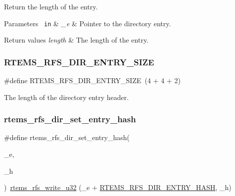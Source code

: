 Return the length of the entry.


\begin{DoxyParams}[1]{Parameters}
\mbox{\texttt{ in}}  & {\em \+\_\+e} & Pointer to the directory entry.\\
\hline
\end{DoxyParams}

\begin{DoxyRetVals}{Return values}
{\em length} & The length of the entry. \\
\hline
\end{DoxyRetVals}
\mbox{\label{rtems-rfs-dir_8h_a57764521961897da4d101db20a52b054}} 
\subsubsection{\texorpdfstring{RTEMS\_RFS\_DIR\_ENTRY\_SIZE}{RTEMS\_RFS\_DIR\_ENTRY\_SIZE}}
{\footnotesize\ttfamily \#define R\+T\+E\+M\+S\+\_\+\+R\+F\+S\+\_\+\+D\+I\+R\+\_\+\+E\+N\+T\+R\+Y\+\_\+\+S\+I\+ZE~(4 + 4 + 2)}

The length of the directory entry header. \mbox{\label{rtems-rfs-dir_8h_a654eb125381a6880f1f2c681c762888c}} 
\subsubsection{\texorpdfstring{rtems\_rfs\_dir\_set\_entry\_hash}{rtems\_rfs\_dir\_set\_entry\_hash}}
{\footnotesize\ttfamily \#define rtems\+\_\+rfs\+\_\+dir\+\_\+set\+\_\+entry\+\_\+hash(\begin{DoxyParamCaption}\item[{}]{\+\_\+e,  }\item[{}]{\+\_\+h }\end{DoxyParamCaption})~\mbox{\hyperlink{rtems-rfs-data_8h_a0e7b57b15dac03868caaeb7d2c8c1ba7}{rtems\+\_\+rfs\+\_\+write\+\_\+u32}} (\+\_\+e + \mbox{\hyperlink{rtems-rfs-dir_8h_a63fb1e0d701229800ef9f1206d8ac295}{R\+T\+E\+M\+S\+\_\+\+R\+F\+S\+\_\+\+D\+I\+R\+\_\+\+E\+N\+T\+R\+Y\+\_\+\+H\+A\+SH}}, \+\_\+h)}

